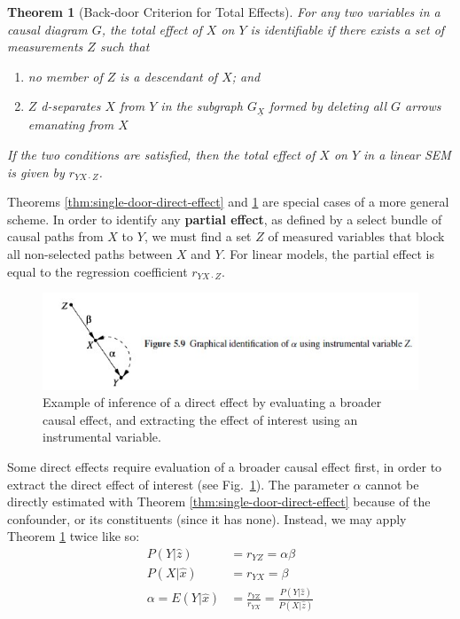 \documentclass[11pt]{article}
\numberwithin{equation}{section}
\newtheorem{thm}{Theorem}[section]
\begin{document}
\begin{thm}[Back-door Criterion for Total Effects]
For any two variables in a causal diagram $G$, the total effect of $X$ on $Y$ is identifiable if there exists a set of measurements $Z$ such that 
\begin{enumerate}
\item no member of $Z$ is a descendant of $X$; and
\item $Z$ d-separates $X$ from $Y$ in the subgraph $G_{\underline{X}}$ formed by deleting all $G$ arrows emanating from $X$
\end{enumerate}
If the two conditions are satisfied, then the total effect of $X$ on $Y$ in a linear SEM is given by $r_{YX\cdot Z}$. \label{thm:back-door-total-effect}
\end{thm}

Theorems \ref{thm:single-door-direct-effect} and \ref{thm:back-door-total-effect} are special cases of a more general scheme. In order to identify any \textbf{partial effect}, as defined by a select bundle of causal paths from $X$ to $Y$, we must find a set $Z$ of measured variables that block all non-selected paths between $X$ and $Y$. For linear models, the partial effect is equal to the regression coefficient $r_{YX\cdot Z}$.

\begin{figure}
\begin{center}
\includegraphics[width=0.8\columnwidth]{figures/instrumental-variable.jpg}  
\end{center}
\caption{Example of inference of a direct effect by evaluating a broader causal effect, and extracting the effect of interest using an instrumental variable.}
\label{Fig:instrument}
\end{figure}

Some direct effects require evaluation of a broader causal effect first, in order to extract the direct effect of interest (see Fig.~\ref{Fig:instrument}). The parameter $\alpha$ cannot be directly estimated with Theorem \ref{thm:single-door-direct-effect} because of the confounder, or its constituents (since it has none). Instead, we may apply Theorem \ref{thm:back-door-total-effect} twice like so:
\begin{align}
P(Y|\hat{z}) &= r_{YZ} = \alpha \beta \\
P(X|\hat{x}) &= r_{YX} = \beta \\
\alpha = E(Y|\hat{x}) &= \frac{r_{YZ}}{r_{YX}} = \frac{P(Y|\hat{z})}{P(X|\hat{z})}
\end{align}
\end{document}
